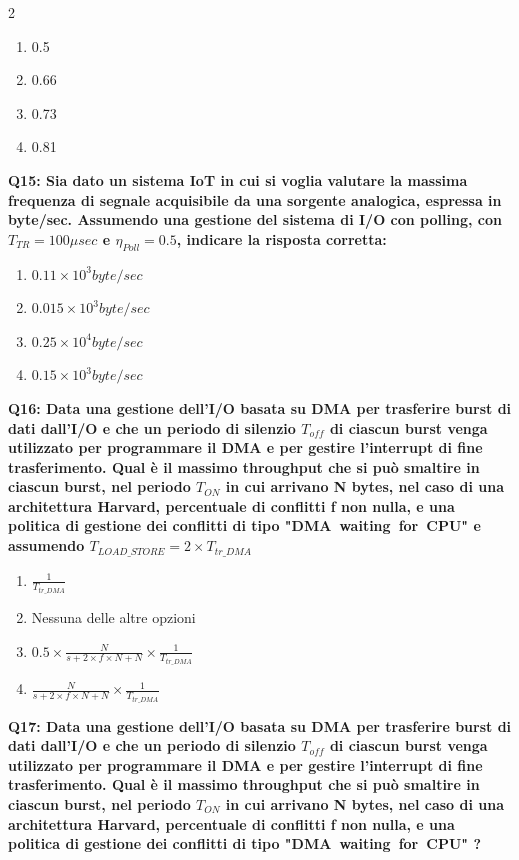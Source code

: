 \documentclass[10pt]{article}
\begin{document}
\begin{multicols}{2}
\begin{enumerate}[label=\arabic*.]
\item 0.5
\item 0.66
\item 0.73
\item 0.81
\end{enumerate}
\textbf{Q15: Sia dato un sistema IoT in cui si voglia valutare la massima frequenza di segnale acquisibile da una sorgente analogica, espressa in byte/sec. Assumendo una gestione del sistema di I/O con polling, con $T_{TR}=100\mu sec$ e $\eta_{Poll}=0.5$, indicare la risposta corretta:}

\begin{enumerate}[label=\arabic*.]
\item $0.11\times10^3 byte/sec$
\item $0.015\times10^3 byte/sec$
\item $0.25\times10^4 byte/sec$
\item $0.15\times10^3 byte/sec$
\end{enumerate}
\textbf{Q16: Data una gestione dell’I/O basata su DMA per trasferire burst di dati dall’I/O e che un periodo di silenzio $T_{off}$ di ciascun burst venga utilizzato per programmare il DMA e per gestire l’interrupt di fine trasferimento. Qual è il massimo throughput che si può smaltire in ciascun burst, nel periodo $T_{ON}$ in cui arrivano N bytes, nel caso di una architettura Harvard, percentuale di conflitti f non nulla, e una politica di gestione dei conflitti di tipo "DMA waiting for CPU" e assumendo $T_{LOAD\_STORE} = 2 \times T_{tr\_DMA}$}

\begin{enumerate}[label=\arabic*.]
\item $\frac{1}{T_{tr\_DMA}}$
\item Nessuna delle altre opzioni
\item $0.5 \times \frac{N}{s+ 2 \times f \times N + N} \times \frac{1}{T_{tr\_DMA}} $
\item $\frac{N}{s+ 2 \times f \times N + N} \times \frac{1}{T_{tr\_DMA}} $
\end{enumerate}
\textbf{Q17: Data una gestione dell’I/O basata su DMA per trasferire burst di dati dall’I/O e che un periodo di silenzio $T_{off}$ di ciascun burst venga utilizzato per programmare il DMA e per gestire l’interrupt di fine trasferimento. Qual è il massimo throughput che si può smaltire in ciascun burst, nel periodo $T_{ON}$ in cui arrivano N bytes, nel caso di una architettura Harvard, percentuale di conflitti f non nulla, e una politica di gestione dei conflitti di tipo "DMA waiting for CPU" ?}


\end{multicols}
\end{document}
